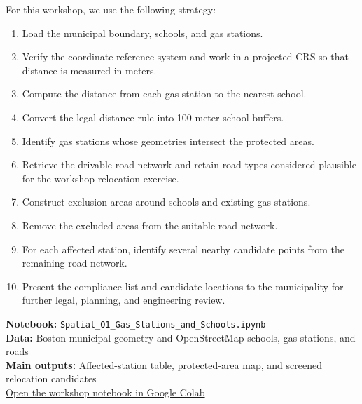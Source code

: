 \documentclass[11pt]{article}
\newcommand{\colablink}{\href{https://colab.research.google.com/}{Open the workshop notebook in Google Colab}}
\begin{document}
For this workshop, we use the following strategy:

\begin{enumerate}[leftmargin=*]

    \item Load the municipal boundary, schools, and gas stations.

    \item Verify the coordinate reference system and work in a projected CRS so that distance is measured in meters.

    \item Compute the distance from each gas station to the nearest school.

    \item Convert the legal distance rule into 100-meter school buffers.

    \item Identify gas stations whose geometries intersect the protected areas.

    \item Retrieve the drivable road network and retain road types considered plausible for the workshop relocation exercise.

    \item Construct exclusion areas around schools and existing gas stations.

    \item Remove the excluded areas from the suitable road network.

    \item For each affected station, identify several nearby candidate points from the remaining road network.

    \item Present the compliance list and candidate locations to the municipality for further legal, planning, and engineering review.

\end{enumerate}

\begin{notebookbox}
\textbf{Notebook:} \texttt{Spatial\_Q1\_Gas\_Stations\_and\_Schools.ipynb}\\
\textbf{Data:} Boston municipal geometry and OpenStreetMap schools, gas stations, and roads\\
\textbf{Main outputs:} Affected-station table, protected-area map, and screened relocation candidates\\[0.5em]
\colablink
\end{notebookbox}
\end{document}
